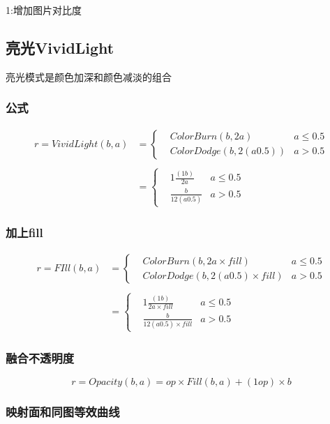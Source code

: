 1:增加图片对比度

\subsection{ 亮光VividLight}

亮光模式是颜色加深和颜色减淡的组合

\subsubsection{ 公式}

$$\begin{aligned}r=VividLight(b,a)&=\left\{ \begin{aligned}&ColorBurn(b,2a)&a\leq 0.5\\&ColorDodge(b,2(a0.5))&a> 0.5 \end{aligned}\right.\\&\\&=\left\{ \begin{aligned}&1\frac{(1b)}{2a}&a\leq 0.5\\&\frac{b}{12(a0.5)}&a>0.5\end{aligned}\right.\end{aligned}$$

\subsubsection{ 加上fill}

$$\begin{aligned}r=FIll(b,a)&=\left\{ \begin{aligned}&ColorBurn(b,2a\times fill)&a\leq 0.5\\&ColorDodge(b,2(a0.5)\times fill)&a> 0.5 \end{aligned}\right.\\&\\&=\left\{ \begin{aligned}&1\frac{(1b)}{2a\times fill}&a\leq 0.5\\&\frac{b}{12(a0.5)\times fill}&a>0.5\end{aligned}\right.\end{aligned}$$

\subsubsection{ 融合不透明度}

$$r=Opacity(b,a)=op\times Fill(b,a)+(1op)\times b$$

\subsubsection{ 映射面和同图等效曲线}

